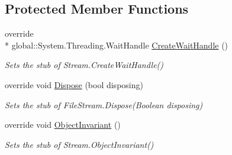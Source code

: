 \subsection*{Protected Member Functions}
\begin{DoxyCompactItemize}
\item 
override \\*
global\-::\-System.\-Threading.\-Wait\-Handle \hyperlink{class_system_1_1_i_o_1_1_fakes_1_1_stub_file_stream_ae948a15abb5bce0553578b8e2da29998}{Create\-Wait\-Handle} ()
\begin{DoxyCompactList}\small\item\em Sets the stub of Stream.\-Create\-Wait\-Handle()\end{DoxyCompactList}\item 
override void \hyperlink{class_system_1_1_i_o_1_1_fakes_1_1_stub_file_stream_a3cb11599d30e3bd71859d482fa5740c1}{Dispose} (bool disposing)
\begin{DoxyCompactList}\small\item\em Sets the stub of File\-Stream.\-Dispose(\-Boolean disposing)\end{DoxyCompactList}\item 
override void \hyperlink{class_system_1_1_i_o_1_1_fakes_1_1_stub_file_stream_a8879bb366b5c5a00bb9f330375c09d9d}{Object\-Invariant} ()
\begin{DoxyCompactList}\small\item\em Sets the stub of Stream.\-Object\-Invariant()\end{DoxyCompactList}\end{DoxyCompactItemize}
